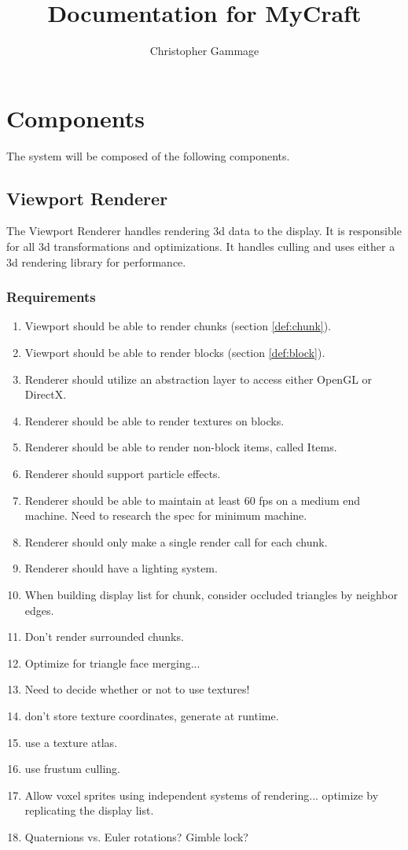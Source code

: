 \documentclass{article}
\newcommand{\targetFPS}{60 fps }
\begin{document}
\title{Documentation for MyCraft}
\author{Christopher Gammage}
\maketitle

\section{Components}

The system will be composed of the following components.

\subsection{Viewport Renderer}
The Viewport Renderer handles rendering 3d data to the display.  It is responsible for all 3d transformations and optimizations.  It handles culling and uses either a 3d rendering library for performance.

\subsubsection{Requirements}
\begin{enumerate}
\item
Viewport should be able to render chunks (section \ref{def:chunk}).
\item
Viewport should be able to render blocks (section \ref{def:block}).
\item
Renderer should utilize an abstraction layer to access either OpenGL or DirectX.
\item
Renderer should be able to render textures on blocks.
\item
Renderer should be able to render non-block items, called Items.
\item
Renderer should support particle effects.
\item
Renderer should be able to maintain at least \targetFPS on a medium end machine.
Need to research the spec for minimum machine.
\item 
Renderer should only make a single render call for each chunk.
\item
Renderer should have a lighting system.
\item
When building display list for chunk, consider occluded triangles by neighbor edges.
\item
Don't render surrounded chunks.
\item
Optimize for triangle face merging...
\item
Need to decide whether or not to use textures!
\item 
don't store texture coordinates, generate at runtime.
\item
use a texture atlas.
\item
use frustum culling.
\item
Allow voxel sprites using independent systems of rendering...
optimize by replicating the display list.
\item
Quaternions vs. Euler rotations? Gimble lock?
\end{enumerate}
\end{document}
